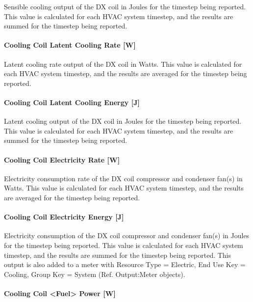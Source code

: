 Sensible cooling output of the DX coil in Joules for the timestep being reported. This value is calculated for each HVAC system timestep, and the results are summed for the timestep being reported.

\paragraph{Cooling Coil Latent Cooling Rate {[}W{]}}

Latent cooling rate output of the DX coil in Watts. This value is calculated for each HVAC system timestep, and the results are averaged for the timestep being reported.

\paragraph{Cooling Coil Latent Cooling Energy {[}J{]}}

Latent cooling output of the DX coil in Joules for the timestep being reported. This value is calculated for each HVAC system timestep, and the results are summed for the timestep being reported.

\paragraph{Cooling Coil Electricity Rate {[}W{]}}

Electricity consumption rate of the DX coil compressor and condenser fan(s) in Watts. This value is calculated for each HVAC system timestep, and the results are averaged for the timestep being reported.

\paragraph{Cooling Coil Electricity Energy {[}J{]}}

Electricity consumption of the DX coil compressor and condenser fan(s) in Joules for the timestep being reported. This value is calculated for each HVAC system timestep, and the results are summed for the timestep being reported. This output is also added to a meter with Resource Type = Electric, End Use Key = Cooling, Group Key = System (Ref. Output:Meter objects).

\paragraph{Cooling Coil <Fuel> Power {[}W{]}}


